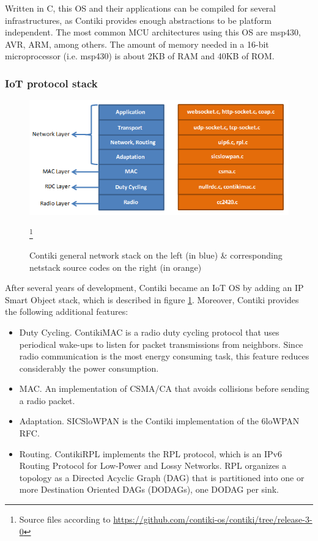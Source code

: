 Written in C, this OS and their applications can be compiled for several infrastructures, as Contiki provides enough abstractions to be platform independent.
The most common MCU architectures using this OS are msp430, AVR, ARM, among others.
The amount of memory needed in a 16-bit microprocessor (i.e. msp430) is about 2KB of RAM and 40KB of ROM.

\subsubsection{IoT protocol stack}
\begin{figure}[htb]
	\centering
	\includegraphics[width=1\columnwidth]{chapters/background.images/Contikinetstack.png}
	\caption{Contiki general network stack on the left (in blue) \& corresponding  netstack source codes on the right (in orange)}\footnote{Source files according to \url{https://github.com/contiki-os/contiki/tree/release-3-0}}
	\label{fig:ContikiNetStack}
\end{figure}
After several years of development, Contiki became an IoT OS by adding an IP Smart Object stack, which is described in figure \ref{fig:ContikiNetStack}.
Moreover, Contiki provides the following additional features:
\begin{itemize}
	\item Duty Cycling. ContikiMAC\cite{dunkels2011contikimac} is a radio duty cycling protocol that uses periodical wake-ups to listen for packet transmissions from neighbors.
	Since radio communication is the most energy consuming task, this feature reduces considerably the power consumption.
	\item MAC. An implementation of CSMA/CA that avoids collisions before sending a radio packet.
	\item Adaptation. SICSloWPAN is the Contiki implementation of the 6loWPAN RFC\cite{rfc4944}.
	\item Routing. ContikiRPL\cite{tsiftes2010contikirpl} implements the RPL\cite{rfc6550} protocol, which is an IPv6 Routing Protocol for Low-Power and Lossy Networks. RPL organizes a	topology as a Directed Acyclic Graph (DAG) that is partitioned into one or more Destination Oriented DAGs (DODAGs), one DODAG per sink.
\end{itemize}

